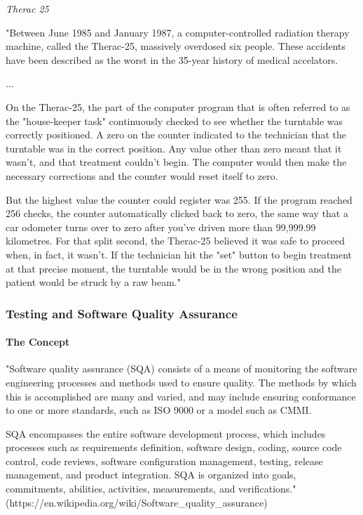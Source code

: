 \documentclass[11pt]{article}
\begin{document}
\emph{Therac 25}

"Between June 1985 and January 1987, a computer-controlled radiation
therapy machine, called the Therac-25, massively overdosed six people.
These accidents have been described as the worst in the 35-year history
of medical accelators.

...

On the Therac-25, the part of the computer program that is often
referred to as the "house-keeper task" continuously checked to see
whether the turntable was correctly positioned. A zero on the counter
indicated to the technician that the turntable was in the correct
position. Any value other than zero meant that it wasn't, and that
treatment couldn't begin. The computer would then make the necessary
corrections and the counter would reset itself to zero.

But the highest value the counter could register was 255. If the program
reached 256 checks, the counter automatically clicked back to zero, the
same way that a car odometer turns over to zero after you've driven more
than 99,999.99 kilometres. For that split second, the Therac-25 believed
it was safe to proceed when, in fact, it wasn't. If the technician hit
the "set" button to begin treatment at that precise moment, the
turntable would be in the wrong position and the patient would be struck
by a raw beam."

    \subsubsection{Testing and Software Quality
Assurance}\label{testing-and-software-quality-assurance}

\paragraph{The Concept}\label{the-concept}

"Software quality assurance (SQA) consists of a means of monitoring the
software engineering processes and methods used to ensure quality. The
methods by which this is accomplished are many and varied, and may
include ensuring conformance to one or more standards, such as ISO 9000
or a model such as CMMI.

SQA encompasses the entire software development process, which includes
processes such as requirements definition, software design, coding,
source code control, code reviews, software configuration management,
testing, release management, and product integration. SQA is organized
into goals, commitments, abilities, activities, measurements, and
verifications."
(https://en.wikipedia.org/wiki/Software\_quality\_assurance)
\end{document}
